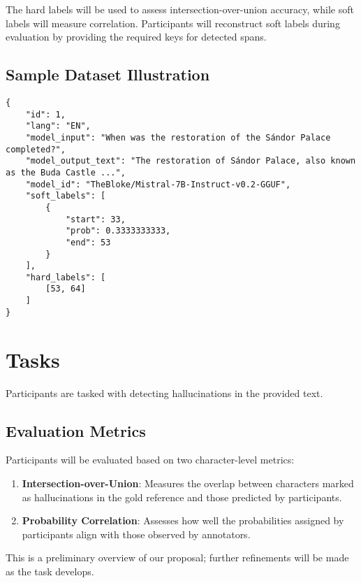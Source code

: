 \documentclass{article}
\begin{document}
The hard labels will be used to assess intersection-over-union accuracy, while soft labels will measure correlation. Participants will reconstruct soft labels during evaluation by providing the required keys for detected spans.

\subsection{Sample Dataset Illustration}

\begin{verbatim}
{
    "id": 1,
    "lang": "EN",
    "model_input": "When was the restoration of the Sándor Palace completed?",
    "model_output_text": "The restoration of Sándor Palace, also known as the Buda Castle ...",
    "model_id": "TheBloke/Mistral-7B-Instruct-v0.2-GGUF",
    "soft_labels": [
        {
            "start": 33,
            "prob": 0.3333333333,
            "end": 53
        }
    ],
    "hard_labels": [
        [53, 64]
    ]
}
\end{verbatim}

\section{Tasks}

Participants are tasked with detecting hallucinations in the provided text. 

\subsection{Evaluation Metrics}

Participants will be evaluated based on two character-level metrics:

\begin{enumerate}
    \item \textbf{Intersection-over-Union}: Measures the overlap between characters marked as hallucinations in the gold reference and those predicted by participants.
    \item \textbf{Probability Correlation}: Assesses how well the probabilities assigned by participants align with those observed by annotators.
\end{enumerate}
This is a preliminary overview of our proposal; further refinements will be made as the task develops.
\end{document}
